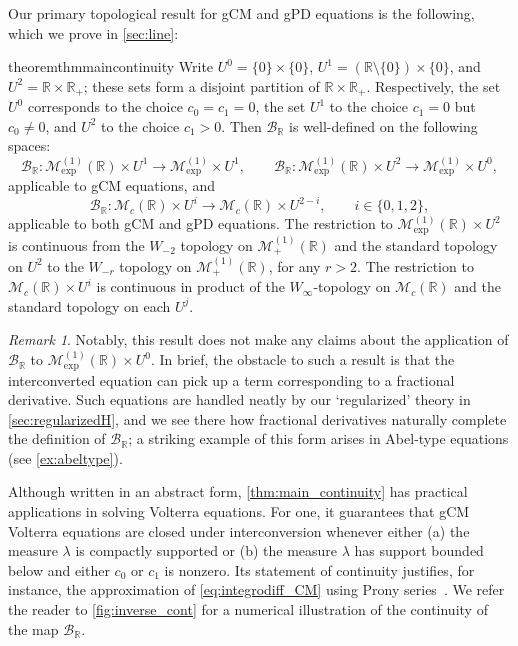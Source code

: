 \documentclass{cams-l} %
\newcommand{\RR}{\mathbb R}
\newcommand{\cM}{\mathcal M}
\newcommand{\cB}{\mathcal B}
\theoremstyle{definition}
\theoremstyle{remark}
\newtheorem{remark}[theorem]{Remark}
\numberwithin{equation}{section}
\begin{document}
Our primary topological result for gCM and gPD equations is the following, which we prove in \cref{sec:line}:
\begin{restatable}[Existence and weak continuity of $\cB_\RR$]{theorem}{thmmaincontinuity}\label{thm:main_continuity}
	Write $U^{0}=\{0\}\times\{0\}$, $U^1=(\RR\setminus\{0\})\times\{0\}$, and $U^2=\RR\times\RR_+$; these sets form a disjoint partition of $\RR\times\RR_+$. Respectively, the set $U^0$ corresponds to the choice $c_0=c_1=0$, the set $U^1$ to the choice $c_1=0$ but $c_0\neq 0$, and $U^2$ to the choice $c_1>0$. Then $\cB_\RR$ is well-defined on the following spaces:
 	\[\cB_\RR:\cM_\mathrm{exp}^{(1)}(\RR)\times U^1\to\cM_\mathrm{exp}^{(1)}\times U^1,\qquad \cB_\RR:\cM_\mathrm{exp}^{(1)}(\RR)\times U^2\to\cM_\mathrm{exp}^{(1)}\times U^0,\]
    applicable to gCM equations, and
    \[\cB_\RR:\cM_c(\RR)\times U^i\to\cM_c(\RR)\times U^{2-i},\qquad i \in \{0,1,2\},\]
    applicable to both gCM and gPD equations. The restriction to $\cM_\mathrm{exp}^{(1)}(\RR)\times U^2$ is continuous from the $W_{-2}$ topology on $\cM_+^{(1)}(\RR)$ and the standard topology on $U^2$ to the $W_{-r}$ topology on $\cM_+^{(1)}(\RR)$, for any $r>2$. The restriction to $\cM_c(\RR)\times U^i$ is continuous in product of the $W_\infty$-topology on $\cM_c(\RR)$ and the standard topology on each $U^j$. %
\end{restatable}
\begin{remark}\label{rem:Br_failure}
    Notably, this result does not make any claims about the application of $\cB_\RR$ to $\cM_\mathrm{exp}^{(1)}(\RR)\times U^0$. In brief, the obstacle to such a result is that the interconverted equation can pick up a term corresponding to a fractional derivative. Such equations are handled neatly by our `regularized' theory in \cref{sec:regularizedH}, and we see there how fractional derivatives naturally complete the definition of $\cB_\RR$; a striking example of this form arises in Abel-type equations (see \cref{ex:abeltype}).
\end{remark}
Although written in an abstract form, \cref{thm:main_continuity} has practical applications in solving Volterra equations. For one, it guarantees that gCM Volterra equations are closed under interconversion whenever either (a) the measure $\lambda$ is compactly supported or (b) the measure $\lambda$ has support bounded below and either $c_0$ or $c_1$ is nonzero. Its statement of continuity justifies, for instance, the approximation of \ref{eq:integrodiff_CM} using {Prony series}~\cite{tschoegl2012phenomenological, serra2019viscoelastic, polyanin2017integral, gross1968mathematical}. We refer the reader to \cref{fig:inverse_cont} for a numerical illustration of the continuity of the map $\cB_\RR$.
\end{document}
